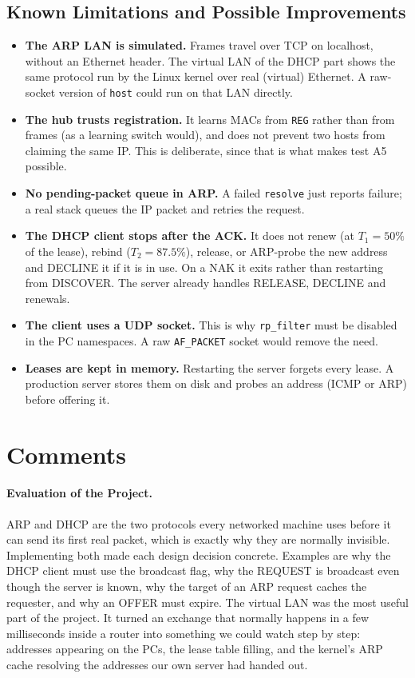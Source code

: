 \documentclass[11pt]{article}
\begin{document}
\subsection{Known Limitations and Possible Improvements}
\begin{itemize}[leftmargin=1.6em]
  \item \textbf{The ARP LAN is simulated.} Frames travel over TCP on localhost, without an
  Ethernet header. The virtual LAN of the DHCP part shows the same protocol run by the
  Linux kernel over real (virtual) Ethernet. A raw-socket version of \texttt{host} could
  run on that LAN directly.
  \item \textbf{The hub trusts registration.} It learns MACs from \texttt{REG} rather than
  from frames (as a learning switch would), and does not prevent two hosts from claiming
  the same IP. This is deliberate, since that is what makes test A5 possible.
  \item \textbf{No pending-packet queue in ARP.} A failed \texttt{resolve} just reports
  failure; a real stack queues the IP packet and retries the request.
  \item \textbf{The DHCP client stops after the ACK.} It does not renew (at $T_1=50\%$ of
  the lease), rebind ($T_2=87.5\%$), release, or ARP-probe the new address and DECLINE it
  if it is in use. On a NAK it exits rather than restarting from DISCOVER. The server
  already handles RELEASE, DECLINE and renewals.
  \item \textbf{The client uses a UDP socket.} This is why \texttt{rp\_filter} must be
  disabled in the PC namespaces. A raw \texttt{AF\_PACKET} socket would remove the need.
  \item \textbf{Leases are kept in memory.} Restarting the server forgets every lease. A
  production server stores them on disk and probes an address (ICMP or ARP) before
  offering it.
\end{itemize}

\section{Comments}

\paragraph{Evaluation of the Project.} ARP and DHCP are the two protocols every networked
machine uses before it can send its first real packet, which is exactly why they are
normally invisible. Implementing both made each design decision concrete. Examples are
why the DHCP client must use the broadcast flag, why the REQUEST is broadcast even though
the server is known, why the target of an ARP request caches the requester, and why an
OFFER must expire. The virtual LAN was the most useful part of the project. It turned an
exchange that normally happens in a few milliseconds inside a router into something we
could watch step by step: addresses appearing on the PCs, the lease table filling, and
the kernel's ARP cache resolving the addresses our own server had handed out.
\end{document}
